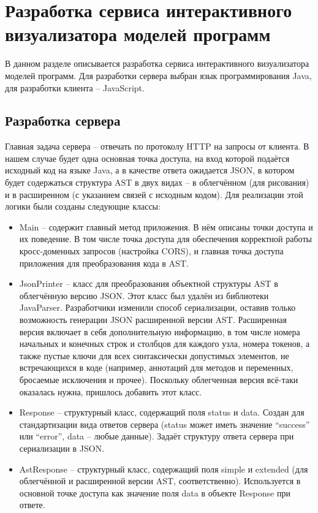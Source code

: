 \chapter{Разработка сервиса интерактивного визуализатора моделей программ} \label{ch5}
В данном разделе описывается разработка сервиса интерактивного визуализатора моделей программ. Для разработки сервера выбран язык программирования Java, для разработки клиента – JavaScript.
\section{Разработка сервера} \label{ch5:sec1}
Главная задача сервера – отвечать по протоколу HTTP на запросы от клиента. В нашем случае будет одна основная точка доступа, на вход которой подаётся исходный код на языке Java, а в качестве ответа ожидается JSON, в котором будет содержаться структура AST в двух видах – в облегчённом (для рисования) и в расширенном (с указанием связей с исходным кодом).
Для реализации этой логики были созданы следующие классы:
\begin{itemize}
\item Main – содержит главный метод приложения. В нём описаны точки доступа и их поведение. В том числе точка доступа для обеспечения корректной работы кросс-доменных запросов (настройка CORS), и главная точка доступа приложения для преобразования кода в AST.
\item JsonPrinter – класс для преобразования объектной структуры AST в облегчённую версию JSON. Этот класс был удалён из библиотеки JavaParser. Разработчики изменили способ сериализации, оставив только возможность генерации JSON расширенной версии AST. Расширенная версия включает в себя дополнительную информацию, в том числе номера начальных и конечных строк и столбцов для каждого узла, номера токенов, а также пустые ключи для всех синтаксически допустимых элементов, не встречающихся в коде (например, аннотаций для методов и переменных, бросаемые исключения и прочее). Поскольку облегченная версия всё-таки оказалась нужна, пришлось добавить этот класс.
\item Response – структурный класс, содержащий поля status и data. Создан для стандартизации вида ответов сервера (status может иметь значение “success” или “error”, data – любые данные). Задаёт структуру ответа сервера при сериализации в JSON.
\item AstResponse – структурный класс, содержащий поля simple и extended (для облегчённой и расширенной версии AST, соответственно). Используется в основной точке доступа как значение поля data в объекте Response при ответе.
\end{itemize}
